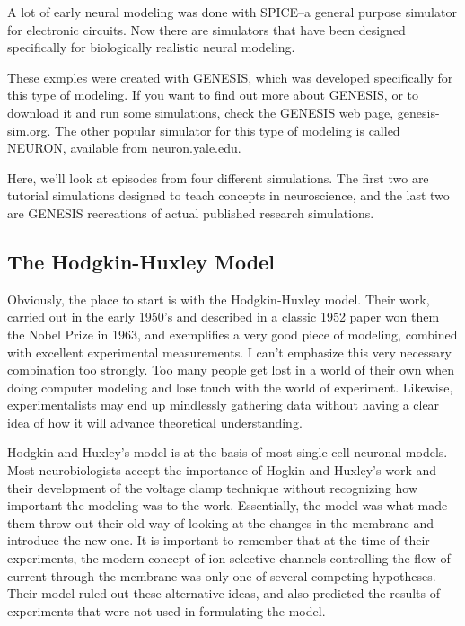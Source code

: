 \documentclass[12pt]{article}
\begin{document}
A lot of early neural modeling was done with SPICE--a general purpose simulator for electronic circuits. Now there are simulators that have been designed specifically for biologically realistic neural modeling.

These exmples were created with GENESIS, which was developed specifically for this type of modeling. If you want to find out more about GENESIS, or to download it and run some simulations, check the GENESIS web page, \href{http://www.genesis-sim.org/}{genesis-sim.org}. The other popular simulator for this type of modeling is called NEURON, available from \href{http://www.neuron.yale.edu/}{neuron.yale.edu}.

Here, we'll look at episodes from four different simulations. The first two are tutorial simulations designed to teach concepts in neuroscience, and the last two are GENESIS recreations of actual published research simulations.

\subsection*{The Hodgkin-Huxley Model}

Obviously, the place to start is with the Hodgkin-Huxley model. Their work, carried out in the early 1950's and described in a classic 1952 paper won them the Nobel Prize in 1963, and exemplifies a very good piece of modeling, combined with excellent experimental measurements. I can't emphasize this very necessary combination too strongly. Too many people get lost in a world of their own when doing computer modeling and lose touch with the world of experiment. Likewise, experimentalists may end up mindlessly gathering data without having a clear idea of how it will advance theoretical understanding.

Hodgkin and Huxley's model is at the basis of most single cell neuronal models. Most neurobiologists accept the importance of Hogkin and Huxley's work and their development of the voltage clamp technique without recognizing how important the modeling was to the work. Essentially, the model was what made them throw out their old way of looking at the changes in the membrane and introduce the new one. It is important to remember that at the time of their experiments, the modern concept of ion-selective channels controlling the flow of current through the membrane was only one of several competing hypotheses. Their model ruled out these alternative ideas, and also predicted the results of experiments that were not used in formulating the model.
\end{document}
